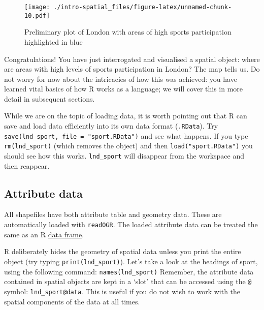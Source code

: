 \documentclass[]{article}
\newenvironment{Shaded}{}{}
\newcommand{\KeywordTok}[1]{\textcolor[rgb]{0.00,0.44,0.13}{\textbf{{#1}}}}
\newcommand{\DataTypeTok}[1]{\textcolor[rgb]{0.56,0.13,0.00}{{#1}}}
\newcommand{\DecValTok}[1]{\textcolor[rgb]{0.25,0.63,0.44}{{#1}}}
\newcommand{\StringTok}[1]{\textcolor[rgb]{0.25,0.44,0.63}{{#1}}}
\newcommand{\OtherTok}[1]{\textcolor[rgb]{0.00,0.44,0.13}{{#1}}}
\newcommand{\NormalTok}[1]{{#1}}
\begin{document}
\begin{Shaded}
\end{Shaded}

\begin{figure}[htbp]
\centering
\texttt{[image: ./intro-spatial\_files/figure-latex/unnamed-chunk-10.pdf]}
\caption{Preliminary plot of London with areas of high sports
participation highlighted in blue}
\end{figure}

Congratulations! You have just interrogated and visualised a spatial
object: where are areas with high levels of sports participation in
London? The map tells us. Do not worry for now about the intricacies of
how this was achieved: you have learned vital basics of how R works as a
language; we will cover this in more detail in subsequent sections.

While we are on the topic of loading data, it is worth pointing out that
R can save and load data efficiently into its own data format
(\texttt{.RData}). Try \texttt{save(lnd\_sport, file = "sport.RData")}
and see what happens. If you type \texttt{rm(lnd\_sport)} (which removes
the object) and then \texttt{load("sport.RData")} you should see how
this works. \texttt{lnd\_sport} will disappear from the workspace and
then reappear.

\subsection{Attribute data}\label{attribute-data}

All shapefiles have both attribute table and geometry data. These are
automatically loaded with \texttt{readOGR}. The loaded attribute data
can be treated the same as an R
\href{http://www.statmethods.net/input/datatypes.html}{data frame}.

R deliberately hides the geometry of spatial data unless you print the
entire object (try typing \texttt{print(lnd\_sport)}). Let's take a look
at the headings of sport, using the following command:
\texttt{names(lnd\_sport)} Remember, the attribute data contained in
spatial objects are kept in a `slot' that can be accessed using the
\texttt{@} symbol: \texttt{lnd\_sport@data}. This is useful if you do
not wish to work with the spatial components of the data at all times.
\end{document}
